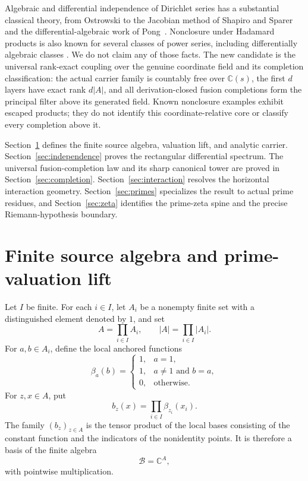 \documentclass[11pt]{article}
\theoremstyle{definition}
\theoremstyle{remark}
\newcommand{\C}{\mathbb C}
\newcommand{\cB}{\mathcal B}
\begin{document}
Algebraic and differential independence of Dirichlet series has a substantial classical theory,
from Ostrowski to the Jacobian method of Shapiro and Sparer and the differential-algebraic work of
Pong~\cite{Ostrowski1920,ShapiroSparer1986,Pong2016}.  Nonclosure under Hadamard products is also
known for several classes of power series, including differentially algebraic classes
\cite{Sharif1999,AlloucheMendesFrance2011}.  We do not claim any of those facts.  The new candidate
is the universal rank-exact coupling over the genuine coordinate field and its completion
classification: the actual carrier family is countably free over \(\C(s)\), the first \(d\)
layers have exact rank \(d|A|\), and all derivation-closed fusion completions form the principal
filter above its generated field.  Known nonclosure examples exhibit escaped products; they do
not identify this coordinate-relative core or classify every completion above it.

Section~\ref{sec:source} defines the finite source algebra, valuation lift, and analytic carrier.
Section~\ref{sec:independence} proves the rectangular differential spectrum.  The universal
fusion-completion law and its sharp canonical tower are proved in
Section~\ref{sec:completion}.  Section~\ref{sec:interaction} resolves the horizontal interaction
geometry.  Section~\ref{sec:primes} specializes the result to actual prime residues, and
Section~\ref{sec:zeta} identifies the prime-zeta spine and the precise Riemann-hypothesis boundary.

\section{Finite source algebra and prime-valuation lift}\label{sec:source}

Let \(I\) be finite.  For each \(i\in I\), let \(A_i\) be a nonempty finite set with a
distinguished element denoted by \(1\), and set
\[
 A=\prod_{i\in I}A_i,
 \qquad |A|=\prod_{i\in I}|A_i|.
\]
For \(a,b\in A_i\), define the local anchored functions
\[
 \beta_a(b)=
 \begin{cases}
 1,&a=1,\\
 1,&a\neq1\text{ and }b=a,\\
 0,&\text{otherwise}.
 \end{cases}
\]
For \(z,x\in A\), put
\begin{equation}\label{eq:anchored-basis}
 b_z(x)=\prod_{i\in I}\beta_{z_i}(x_i).
\end{equation}
The family \((b_z)_{z\in A}\) is the tensor product of the local bases consisting of the constant
function and the indicators of the nonidentity points.  It is therefore a basis of the finite
algebra
\[
 \cB=\C^A,
\]
with pointwise multiplication.
\end{document}
